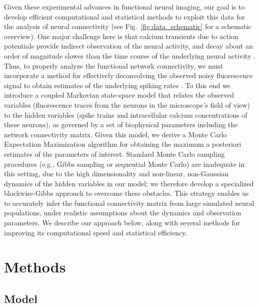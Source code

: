\documentclass[aoas,preprint]{imsart}
\begin{document}
Given these experimental advances in functional neural imaging, our goal is to develop efficient computational and statistical methods to exploit this data for the analysis of neural connectivity (see Fig.~\ref{fig:data_schematic} for a schematic overview). One major challenge here is that calcium transients due to action potentials provide indirect observation of the neural activity, and decay about an order of magnitude slower than the time course of the underlying neural activity \cite{ImagingManual}. Thus, to properly analyze the functional network connectivity, we must incorporate a method for effectively deconvolving the observed noisy fluorescence signal to obtain estimates of the underlying spiking rates \cite{YaksiFriedrich06,GreenbergKerr08,Vogelstein2009}. To this end we introduce a coupled Markovian state-space model that relates the observed variables (fluorescence traces from the neurons in the microscope's field of view) to the hidden variables (spike trains and intracellular calcium concentrations of these neurons), as governed by a set of biophysical parameters including the network connectivity matrix. Given this model, we derive a Monte Carlo Expectation Maximization algorithm for obtaining the maximum a posteriori estimates of the parameters of interest. Standard Monte Carlo sampling procedures (e.g., Gibbs sampling or sequential Monte Carlo) are inadequate in this setting, due to the high dimensionality and non-linear, non-Gaussian dynamics of the hidden variables in our model; we therefore develop a specialized blockwise-Gibbs approach to overcome these obstacles. This strategy enables us to accurately infer the functional connectivity matrix from large simulated neural populations, under realistic assumptions about the dynamics and observation parameters. We describe our approach below, along with several methods for improving its computational speed and statistical efficiency.

\section{Methods}
\label{sec:methods}
\subsection{Model}
\label{sec:methods:markov-setup}
\end{document}

